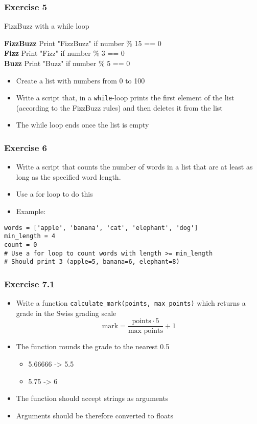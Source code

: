 \documentclass[10pt, a4paper]{beamer} %
\begin{document}
{\begin{frame}[c, fragile]\frametitle{Exercise 5}
	FizzBuzz with a while loop

	\textbf{FizzBuzz} Print "FizzBuzz" if number \% 15 == 0\\
	\textbf{Fizz} Print "Fizz" if number \% 3 == 0\\
	\textbf{Buzz} Print "Buzz" if number \% 5 == 0

	\begin{itemize}
		\item Create a list with numbers from 0 to 100
		\item Write a script that, in a \texttt{while}-loop prints the first element of the list (according to the FizzBuzz rules) and then deletes it from the list
		\item The while loop ends once the list is empty
	\end{itemize}
\end{frame}


\begin{frame}[c, fragile]\frametitle{Exercise 6}
	\begin{itemize}
		\item Write a script that counts the number of words in a list that are at least as long
		      as the specified word length.
		\item Use a for loop to do this
		\item Example:
	\end{itemize}

		{
		\mdseries
		\begin{lstlisting}
words = ['apple', 'banana', 'cat', 'elephant', 'dog']
min_length = 4
count = 0
# Use a for loop to count words with length >= min_length
# Should print 3 (apple=5, banana=6, elephant=8)
\end{lstlisting}
		}

\end{frame}

\begin{frame}\frametitle{Exercise 7.1}

	\begin{itemize}
		\item Write a function \texttt{calculate\_mark(points, max\_points)} which returns a grade in the Swiss grading scale
		      \[ \text{mark} = \frac{\text{points}\cdot 5}{\text{max points}} + 1 \]
		\item The function rounds the grade to the nearest 0.5
		      \begin{itemize}
			      \item 5.66666 -> 5.5
			      \item 5.75 -> 6
		      \end{itemize}
		\item The function should accept strings as arguments
		\item Arguments should be therefore converted to floats
	\end{itemize}


\end{frame}}
\end{document}
